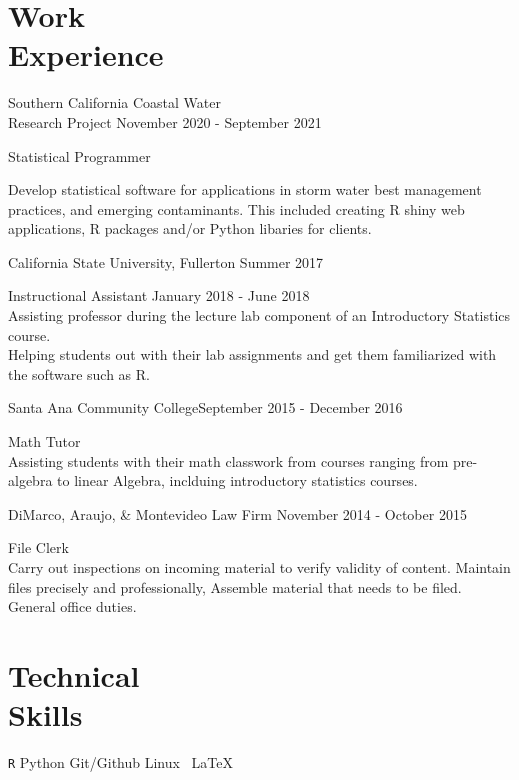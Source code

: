 \documentclass[margin,line]{res}
\newenvironment{list1}{
  \begin{list}{\ding{113}}{
      \setlength{\itemsep}{0in}
      \setlength{\parsep}{0in} \setlength{\parskip}{0in}
      \setlength{\topsep}{0in} \setlength{\partopsep}{0in} 
      \setlength{\leftmargin}{0.20in}}}{\end{list}}
\begin{document}
\begin{resume}
\section{\sc Work \\ Experience}
{\sc Southern California Coastal Water\\ Research Project} \hfill {November 2020 - September 2021}\\
\vspace*{-.12in}
\begin{list1}
\itemsep3pt
\item[] Statistical Programmer \\
\vskip -6pt

Develop statistical software for applications in storm water best management practices, and emerging contaminants. This included creating R shiny web applications, R packages and/or Python libaries for clients.
\end{list1}

{\sc California State University, Fullerton} \hfill {Summer 2017}\\
\vspace*{-.15in}
\begin{list1}
\item[] {\sc Instructional Assistant} \hfill{January 2018 - June 2018} \\
\vskip -6pt
Assisting professor during the lecture lab component of an Introductory Statistics course. \\
Helping students out with their lab assignments and get them familiarized with the software such as R. 

\end{list1}
{\sc Santa Ana Community College}\hfill {September 2015 - December 2016 }\\
\vspace*{-.15in}
\begin{list1}
\item[] {\sc Math Tutor}  \\
\vskip -6pt
Assisting students with their math classwork from courses ranging from pre-algebra to linear Algebra, inclduing introductory statistics courses.
\end{list1}

{\sc DiMarco, Araujo, \& Montevideo Law Firm} \hfill {November 2014 - October 2015}\\
\vspace*{-.15in}
\begin{list1}
\item[]{\sc File Clerk}\\
\vskip -6pt
Carry out inspections on incoming material to verify validity of content. Maintain files precisely and professionally, Assemble material that needs to be filed. General office duties.
\end{list1}

\section{\sc Technical\\ Skills}
\verb|R|  \hspace{2ex} Python   \hspace{2ex} Git/Github \hspace{2ex}
Linux \hspace{2ex} \, \LaTeX 

\end{resume}
\end{document}
